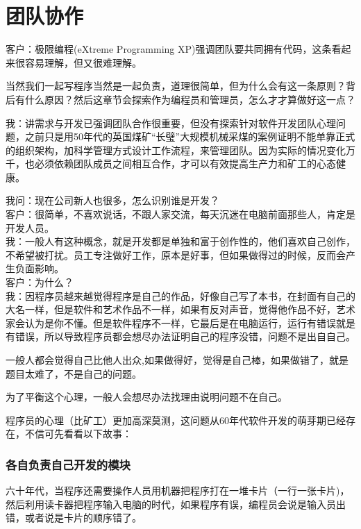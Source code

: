 \chapter{团队协作} %

客户：极限编程(eXtreme Programming
XP)强调团队要共同拥有代码，这条看起来很容易理解，但又很难理解。

当然我们一起写程序当然是一起负责，道理很简单，但为什么会有这一条原则？背后有什么原因？然后这章节会探索作为编程员和管理员，怎么才才算做好这一点？

我：讲需求与开发已强调团队合作很重要，但没有探索针对软件开发团队心理问题，之前只是用50年代的英国煤矿``长璧''大规模机械采煤的案例证明不能单靠正式的组织架构，加科学管理方式设计工作流程，来管理团队。因为实际的情况变化万千，也必须依赖团队成员之间相互合作，才可以有效提高生产力和矿工的心态健康。

我问：现在公司新人也很多，怎么识别谁是开发？\\
客户：很简单，不喜欢说话，不跟人家交流，每天沉迷在电脑前面那些人，肯定是开发人员。\\
我：一般人有这种概念，就是开发都是单独和富于创作性的，他们喜欢自己创作，不希望被打扰。员工专注做好工作，原本是好事，但如果做得过的时候，反而会产生负面影响。\\
客户：为什么？\\
我：因程序员越来越觉得程序是自己的作品，好像自己写了本书，在封面有自己的大名一样，但是软件和艺术作品不一样，如果有反对声音，觉得他作品不好，艺术家会认为是你不懂。但是软件程序不一样，它最后是在电脑运行，运行有错误就是有错误，所以导致程序员都会想尽办法证明自己的程序没错，问题不是出自自己。

一般人都会觉得自己比他人出众,如果做得好，觉得是自己棒，如果做错了，就是题目太难了，不是自己的问题。

为了平衡这个心理，一般人会想尽办法找理由说明问题不在自己。

程序员的心理（比矿工）更加高深莫测，这问题从60年代软件开发的萌芽期已经存在，不信可先看看以下故事：

\hypertarget{ux5404ux81eaux8d1fux8d23ux81eaux5df1ux5f00ux53d1ux7684ux6a21ux5757}{%
\subsection{各自负责自己开发的模块}\label{ux5404ux81eaux8d1fux8d23ux81eaux5df1ux5f00ux53d1ux7684ux6a21ux5757}}

六十年代，当程序还需要操作人员用机器把程序打在一堆卡片（一行一张卡片)，然后利用读卡器把程序输入电脑的时代，如果程序有误，编程员会说是输入员出错，或者说是卡片的顺序错了。\\

